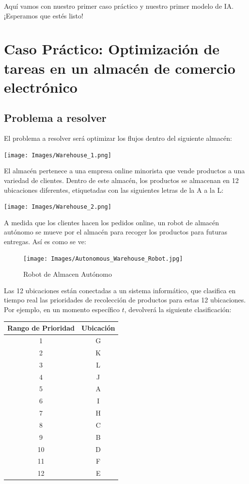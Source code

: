\documentclass[
]{book}
\begin{document}
Aquí vamos con nuestro primer caso práctico y nuestro primer modelo de IA. ¡Esperamos que estés listo!

\hypertarget{caso-pruxe1ctico-optimizaciuxf3n-de-tareas-en-un-almacuxe9n-de-comercio-electruxf3nico}{%
\section{Caso Práctico: Optimización de tareas en un almacén de comercio electrónico}\label{caso-pruxe1ctico-optimizaciuxf3n-de-tareas-en-un-almacuxe9n-de-comercio-electruxf3nico}}

\hypertarget{problema-a-resolver}{%
\subsection{Problema a resolver}\label{problema-a-resolver}}

El problema a resolver será optimizar los flujos dentro del siguiente almacén:

\texttt{[image: Images/Warehouse\_1.png]}

El almacén pertenece a una empresa online minorista que vende productos a una variedad de clientes. Dentro de este almacén, los productos se almacenan en 12 ubicaciones diferentes, etiquetadas con las siguientes letras de la A a la L:

\texttt{[image: Images/Warehouse\_2.png]}

A medida que los clientes hacen los pedidos online, un robot de almacén autónomo se mueve por el almacén para recoger los productos para futuras entregas. Así es como se ve:

\begin{figure}
\centering
\texttt{[image: Images/Autonomous\_Warehouse\_Robot.jpg]}
\caption{Robot de Almacen Autónomo}
\end{figure}

Las 12 ubicaciones están conectadas a un sistema informático, que clasifica en tiempo real las prioridades de recolección de productos para estas 12 ubicaciones. Por ejemplo, en un momento específico \(t\), devolverá la siguiente clasificación:

\begin{longtable}[]{@{}cc@{}}
\toprule
\textbf{Rango de Prioridad} & \textbf{Ubicación} \\
\midrule
\endhead
1 & G \\
2 & K \\
3 & L \\
4 & J \\
5 & A \\
6 & I \\
7 & H \\
8 & C \\
9 & B \\
10 & D \\
11 & F \\
12 & E \\
\bottomrule
\end{longtable}
\end{document}
